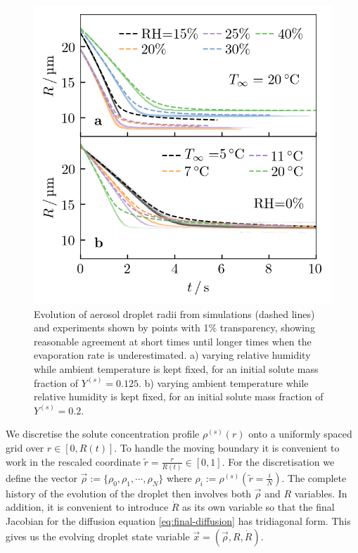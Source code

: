 \documentclass[11pt,twoside]{report}
\begin{document}
\begin{figure}
  \includegraphics[width=0.9\linewidth,outer]{nano3-trajectory}
  \caption[Evolution of drying droplet radii]{
    Evolution of  aerosol droplet radii from simulations (dashed lines) and experiments shown by points with 1\% transparency, showing reasonable agreement at short times until longer times when the evaporation rate is underestimated.
    a) varying relative humidity while ambient temperature is kept fixed, for an initial solute mass fraction of $Y^{(s)} = 0.125$.
    b) varying ambient temperature while relative humidity is kept fixed, for an initial solute mass fraction of $Y^{(s)} = 0.2$.}
  \label{fig:nano3-trajectory}
\end{figure}

We discretise the solute concentration profile $\rho^{(s)}(r)$ onto a uniformly spaced grid over $r \in [0, R(t)]$.
To handle the moving boundary it is convenient to work in the rescaled coordinate $\tilde{r} = \frac{r}{R(t)} \in [0, 1]$.
For the discretisation we define the vector $\vec{\rho} := \{\rho_0, \rho_1, \cdots, \rho_N\}$ where $\rho_i := \rho^{(s)}\left(\tilde{r} = \frac{i}{N}\right)$.
The complete history of the evolution of the droplet then involves both $\vec{\rho}$ and $R$ variables.
In addition, it is convenient to introduce $\dot{R}$ as its own variable so that the final Jacobian for the diffusion equation \eqref{eq:final-diffusion} has tridiagonal form.
This gives us the evolving droplet state variable $\vec{x} = (\vec{\rho}, R, \dot{R})$.
\end{document}
